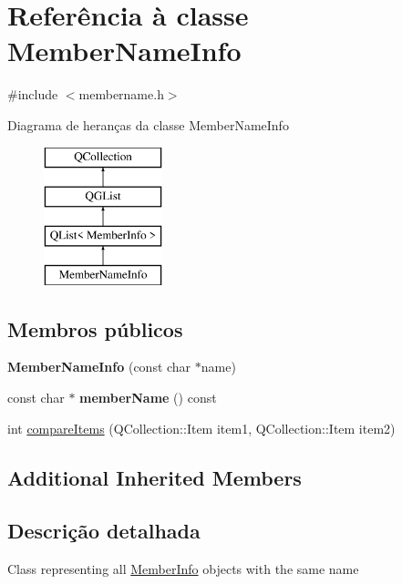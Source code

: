 \hypertarget{class_member_name_info}{\section{Referência à classe Member\-Name\-Info}
\label{class_member_name_info}
}


{\ttfamily \#include $<$membername.\-h$>$}

Diagrama de heranças da classe Member\-Name\-Info\begin{figure}[H]
\begin{center}
\leavevmode
\includegraphics[height=4.000000cm]{class_member_name_info}
\end{center}
\end{figure}
\subsection*{Membros públicos}
\begin{DoxyCompactItemize}
\item 
\hypertarget{class_member_name_info_a1ca60e6efca6dab0386f13fb3fb6a09f}{{\bfseries Member\-Name\-Info} (const char $\ast$name)}\label{class_member_name_info_a1ca60e6efca6dab0386f13fb3fb6a09f}

\item 
\hypertarget{class_member_name_info_a95981d16e8c133c83b27e3d5cac18f36}{const char $\ast$ {\bfseries member\-Name} () const }\label{class_member_name_info_a95981d16e8c133c83b27e3d5cac18f36}

\item 
int \hyperlink{class_member_name_info_a219450accf048597ffc7113ecde4c402}{compare\-Items} (Q\-Collection\-::\-Item item1, Q\-Collection\-::\-Item item2)
\end{DoxyCompactItemize}
\subsection*{Additional Inherited Members}


\subsection{Descrição detalhada}
Class representing all \hyperlink{struct_member_info}{Member\-Info} objects with the same name 

